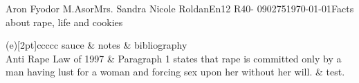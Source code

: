 \documentclass[12pt,letterpaper]{article}
\begin{document}
\begin{mla}{Aron Fyodor M.}{Asor}{Mrs. Sandra Nicole Roldan}{En12 R40- 090275}{\today}{Facts about rape, life and cookies}

	\begin{TAB}(e)[2pt]{ccc}{cc}
		sauce & notes & bibliography \\
		Anti Rape Law of 1997 & Paragraph 1 states that rape is committed only by a man having lust for a woman
		and forcing sex upon her without her will. & test. \\
	\end{TAB}

\end{mla}
\end{document}
